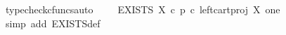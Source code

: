 \begin{isabellebody}
\ {\isacharparenleft}{\kern0pt}typecheck{\isacharunderscore}{\kern0pt}cfuncs{\isacharcomma}{\kern0pt}auto{\isacharparenright}{\kern0pt}\isanewline
\ \isamarkupfalse%
\ \isamarkupfalse%
\ {\isachardoublequoteopen}EXISTS\ X\ {\isasymcirc}\isactrlsub c\ {\isacharparenleft}{\kern0pt}p\ {\isasymcirc}\isactrlsub c\ left{\isacharunderscore}{\kern0pt}cart{\isacharunderscore}{\kern0pt}proj\ X\ one{\isacharparenright}{\kern0pt}\isactrlsup {\isasymsharp}\ {\isacharequal}{\kern0pt}\ {\isasymt}{\isachardoublequoteclose}\isanewline
\ \ \isamarkupfalse%
\ {\isacharparenleft}{\kern0pt}simp\ add{\isacharcolon}{\kern0pt}\ EXISTS{\isacharunderscore}{\kern0pt}def{\isacharparenright}{\kern0pt}\isanewline
{}\isamarkupfalse%
%
\endisatagproof
{\isafoldproof}%
%
\isadelimproof
\isanewline
%
\endisadelimproof
%
\isadelimtheory
\isanewline
%
\endisadelimtheory
%
\isatagtheory
{}\isamarkupfalse%
%
\endisatagtheory
{\isafoldtheory}%
%
\isadelimtheory
%
\endisadelimtheory
%
\end{isabellebody}%
\endinput
